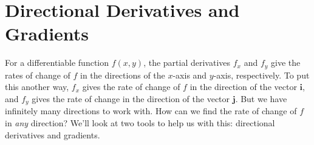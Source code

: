 \documentclass[10pt,]{book}
\theoremstyle{ptxplainnotitle}
\theoremstyle{ptxplaintitle}
\theoremstyle{ptxplainnotitle}
\theoremstyle{ptxplaintitle}
\theoremstyle{ptxplainnotitle}
\theoremstyle{ptxplaintitle}
\theoremstyle{ptxdefinitionnotitle}
\theoremstyle{ptxdefinitiontitle}
\theoremstyle{ptxdefinitionnotitle}
\theoremstyle{ptxdefinitiontitle}
\theoremstyle{ptxdefinitionnotitle}
\theoremstyle{ptxdefinitiontitle}
\theoremstyle{ptxdefinitionnotitle}
\theoremstyle{ptxdefinitiontitle}
\theoremstyle{ptxdefinitionnotitle}
\theoremstyle{ptxdefinitiontitle}
\numberwithin{equation}{section}
\newcommand{\vv}[1]{\mathbf{#1}}
\begin{document}
\section[{Directional Derivatives and Gradients}]{Directional Derivatives and Gradients}\label{section-directional-derivatives-and-gradients}
\hypertarget{p-1052}{}%
For a differentiable function \(f(x,y)\), the partial derivatives \(f_{x}\) and \(f_{y}\) give the rates of change of \(f\) in the directions of the \(x\)-axis and \(y\)-axis, respectively. To put this another way, \(f_{x}\) gives the rate of change of \(f\) in the direction of the vector \(\vv{i}\), and \(f_{y}\) gives the rate of change in the direction of the vector \(\vv{j}\). But we have infinitely many directions to work with. How can we find the rate of change of \(f\) in \emph{any} direction? We'll look at two tools to help us with this: directional derivatives and gradients.%
\typeout{************************************************}
\typeout{************************************************}
\end{document}
